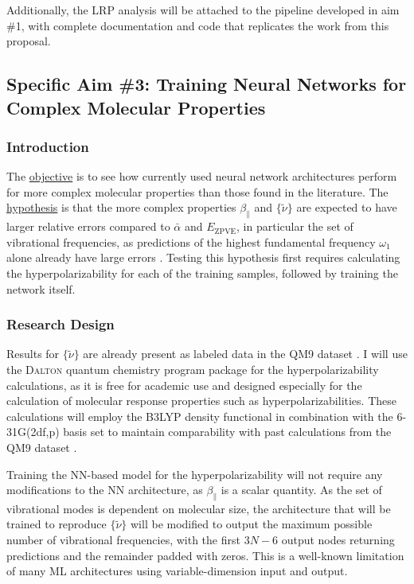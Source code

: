 \documentclass[12pt]{article}
\begin{document}
Additionally, the LRP analysis will be attached to the pipeline developed in aim \#1, with complete documentation and code that replicates the work from this proposal.

\subsection{Specific Aim \#3: Training Neural Networks for Complex Molecular Properties}
\label{sec:org619aabd}

\subsubsection{Introduction}
\label{sec:orgba16139}

The \uline{objective} is to see how currently used neural network architectures perform for more complex molecular properties than those found in the literature. The \uline{hypothesis} is that the more complex properties \(\beta_{\parallel}\) and \(\{\tilde{\nu}\}\) are expected to have larger relative errors compared to \(\bar{\alpha}\) and \(E_{\text{ZPVE}}\), in particular the set of vibrational frequencies, as predictions of the highest fundamental frequency \(\omega_1\) alone already have large errors \cite{2017arXiv170205532F}. Testing this hypothesis first requires calculating the hyperpolarizability for each of the training samples, followed by training the network itself.

\subsubsection{Research Design}
\label{sec:orgc158ba6}

Results for \(\{\tilde{\nu}\}\) are already present as labeled data in the QM9 dataset \cite{Ramakrishnan:2014ij}. I will use the \textsc{Dalton} quantum chemistry program package \cite{daltonpaper} for the hyperpolarizability calculations, as it is free for academic use and designed especially for the calculation of molecular response properties such as hyperpolarizabilities. These calculations will employ the B3LYP density functional in combination with the 6-31G(2df,p) basis set to maintain comparability with past calculations from the QM9 dataset \cite{Ramakrishnan:2014ij}.

Training the NN-based model for the hyperpolarizability will not require any modifications to the NN architecture, as \(\beta_{\parallel}\) is a scalar quantity. As the set of vibrational modes is dependent on molecular size, the architecture that will be trained to reproduce \(\{\tilde{\nu}\}\) will be modified to output the maximum possible number of vibrational frequencies, with the first \(3N-6\) output nodes returning predictions and the remainder padded with zeros. This is a well-known limitation of many ML architectures using variable-dimension input and output.
\end{document}
